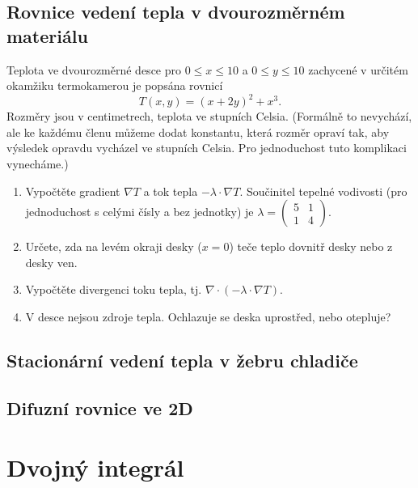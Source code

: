
\subsection{Rovnice vedení tepla v dvourozměrném materiálu}


Teplota ve dvourozměrné desce pro $0\leq x\leq 10$ a $0\leq y\leq 10$ zachycené v určitém okamžiku termokamerou je popsána rovnicí
  $$T(x,y)=(x+2y)^2+x^3.$$
  Rozměry jsou v centimetrech, teplota ve stupních Celsia. (Formálně to nevychází, ale ke každému členu můžeme dodat konstantu, která rozměr opraví tak, aby výsledek opravdu vycházel ve stupních Celsia. Pro jednoduchost tuto komplikaci vynecháme.)

\begin{enumerate}
\item Vypočtěte gradient $\nabla T$  a tok tepla $-\lambda \cdot \nabla T.$
Součinitel tepelné vodivosti (pro jednoduchost s celými čísly a bez jednotky) je $\lambda=
  \begin{pmatrix}
    5 & 1\\1&4
  \end{pmatrix}.
$ 
\item Určete, zda na levém okraji desky ($x=0$) teče teplo dovnitř desky nebo z desky ven.
\item Vypočtěte divergenci toku tepla, tj. $\nabla\cdot(-\lambda \cdot \nabla T).$
\item V desce nejsou zdroje tepla. Ochlazuje se deska uprostřed, nebo otepluje?
\end{enumerate}


\stranka
\subsection{Stacionární vedení tepla v žebru chladiče}

\subsection{Difuzní rovnice ve 2D}

\stranka
\section{Dvojný integrál}

